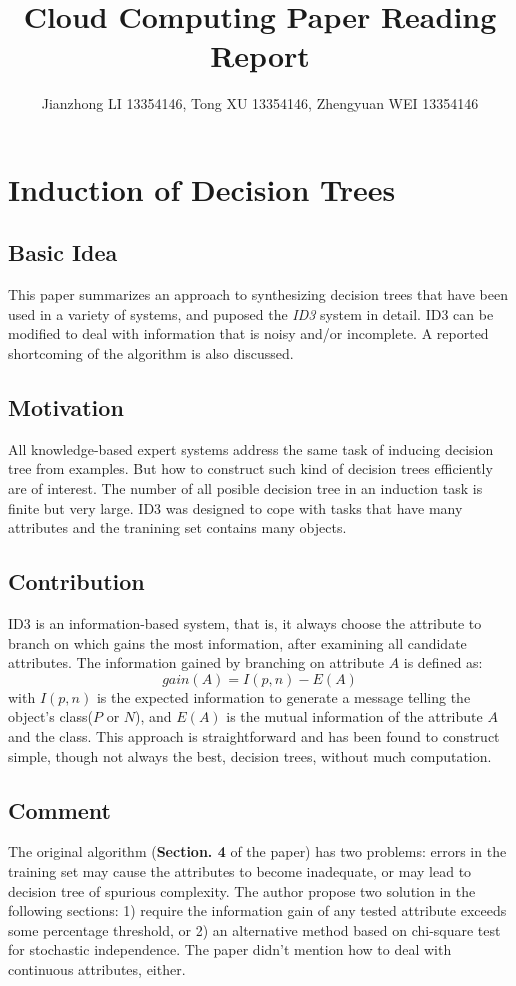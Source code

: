 \documentclass[a4paper]{article}
\title{Cloud Computing Paper Reading Report}
\author{Jianzhong LI 13354146, Tong XU 13354146, Zhengyuan WEI 13354146}
\begin{document}
    \maketitle
    \section{Induction of Decision Trees}
        \subsection{Basic Idea}
        This paper summarizes an approach to synthesizing decision trees that have been used in a variety of systems, and puposed the \textit{ID3} system in detail. ID3 can be modified to deal with information that is noisy and/or incomplete. A reported shortcoming of the algorithm is also discussed.

        \subsection{Motivation}
        All knowledge-based expert systems address the same task of inducing decision tree from examples. But how to construct such kind of decision trees efficiently are of interest. The number of all posible decision tree in an induction task is finite but very large. ID3 was designed to cope with tasks that have many attributes and the tranining set contains many objects.

        \subsection{Contribution}
        ID3 is an information-based system, that is, it always choose the attribute to branch on which gains the most information, after examining all candidate attributes. The information gained by branching on attribute $ A $ is defined as:
        \begin{equation}
            gain(A) = I(p, n) - E(A)
        \end{equation}
        with $ I(p, n) $ is the expected information to generate a message telling the object's class($ P $  or $ N $), and $ E(A) $ is the mutual information of the attribute $ A $ and the class. This approach is straightforward and has been found to construct simple, though not always the best, decision trees, without much computation.

        \subsection{Comment}
        The original algorithm (\textbf{Section. 4} of the paper) has two problems: errors in the training set may cause the attributes to become inadequate, or may lead to decision tree of  spurious complexity. The author propose two solution in the following sections: 1) require the information gain of any tested attribute exceeds some percentage threshold, or 2) an alternative method based on chi-square test for stochastic independence. The paper didn't mention how to deal with continuous attributes, either.
\end{document}
